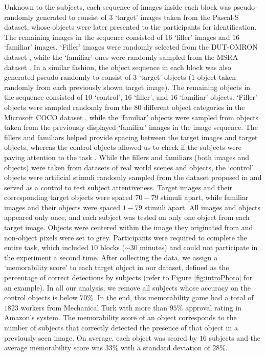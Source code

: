 Unknown to the subjects, each sequence of images inside each block was pseudo-randomly generated to consist of $3$ `target' images taken from the Pascal-S dataset, whose objects were later presented to the participants for identification. The remaining images in the sequence consisted of $16$ `filler' images and $16$ `familiar' images. `Filler' images were randomly selected from the DUT-OMRON dataset \cite{dutomron13}, while the `familiar' ones were randomly sampled from the MSRA dataset \cite{msra11}. In a similar fashion, the object sequence in each block was also generated pseudo-randomly to consist of $3$ `target' objects ($1$ object taken randomly from each previously shown target image). The remaining objects in the sequence consisted of $10$ `control', $16$ `filler', and $16$ `familiar' objects. `Filler' objects were sampled randomly from the $80$ different object categories in the Microsoft COCO dataset \cite{coco14}, while the `familiar' objects were sampled from objects taken from the previously displayed `familiar' images in the image sequence. The fillers and familiars helped provide spacing between the target images and target objects, whereas the control objects allowed us to check if the subjects were paying attention to the task \cite{brady08,isola11}. While the fillers and familiars (both images and objects) were taken from datasets of real world scenes and objects, the `control' objects were artificial stimuli randomly sampled from the dataset proposed in \cite{brady08} and served as a control to test subject attentiveness. Target images and their corresponding target objects were spaced $70-79$ stimuli apart, while familiar images and their objects were spaced $1-79$ stimuli apart. All images and objects appeared only once, and each subject was tested on only one object from each target image. Objects were centered within the image they originated from and non-object pixels were set to grey. Participants were required to complete the entire task, which included $10$ blocks ($\sim$$30$ minutes) and could not participate in the experiment a second time. After collecting the data, we assign a `memorability score' to each target object in our dataset, defined as the percentage of correct detections by subjects (refer to Figure \ref{fig:introPhoto} for an example). In all our analysis, we remove all subjects whose accuracy on the control objects is below $70\%$. In the end, this memorability game had a total of $1823$ workers from Mechanical Turk with more than $95\%$ approval rating in Amazon’s system. The memorability score of an object corresponds to the number of subjects that correctly detected the presence of that object in a previously seen image. On average, each object was scored by $16$ subjects and the average memorability score was $33\%$ with a standard deviation of  $28\%$. %
